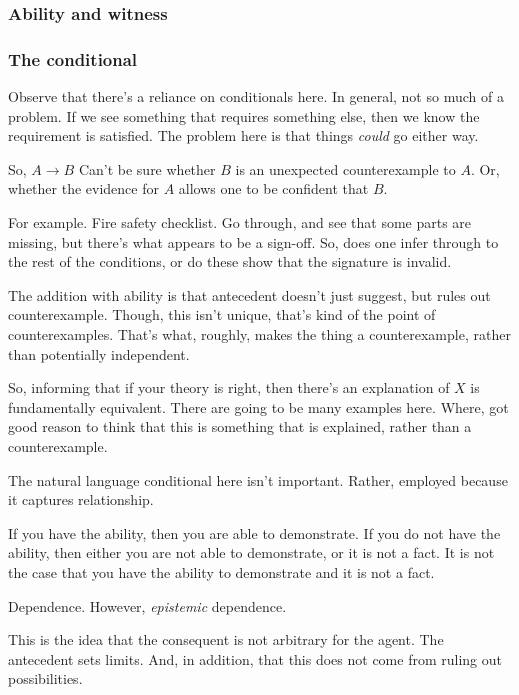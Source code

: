 \documentclass[10pt]{article}
\begin{document}
\subsubsection{Ability and witness}
\label{sec:ability-witness}

\subsubsection{The conditional}
\label{sec:conditional}

\begin{note}[Conditional]
  Observe that there's a reliance on conditionals here.
  In general, not so much of a problem.
  If we see something that requires something else, then we know the requirement is satisfied.
  The problem here is that things \emph{could} go either way.

  So, \(A \rightarrow B\)
  Can't be sure whether \(B\) is an unexpected counterexample to \(A\).
  Or, whether the evidence for \(A\) allows one to be confident that \(B\).

  For example.
  Fire safety checklist.
  Go through, and see that some parts are missing, but there's what appears to be a sign-off.
  So, does one infer through to the rest of the conditions, or do these show that the signature is invalid.

  The addition with ability is that antecedent doesn't just suggest, but rules out counterexample.
  Though, this isn't unique, that's kind of the point of counterexamples.
  That's what, roughly, makes the thing a counterexample, rather than potentially independent.

  So, informing that if your theory is right, then there's an explanation of \(X\) is fundamentally equivalent.
  There are going to be many examples here.
  Where, got good reason to think that this is something that is explained, rather than a counterexample.
\end{note}

The natural language conditional here isn't important.
Rather, employed because it captures relationship.

If you have the ability, then you are able to demonstrate.
If you do not have the ability, then either you are not able to demonstrate, or it is not a fact.
It is not the case that you have the ability to demonstrate and it is not a fact.

{
  \color{red}
  Dependence.
}
However, \emph{epistemic} dependence.

This is the idea that the consequent is not arbitrary for the agent.
The antecedent sets limits.
And, in addition, that this does not come from ruling out possibilities.
\end{document}
